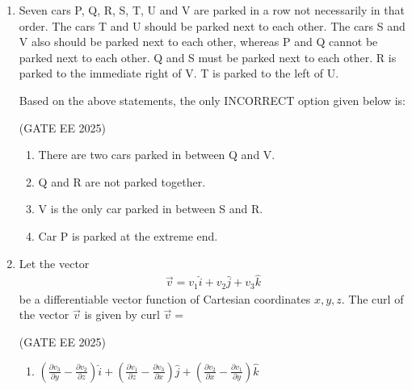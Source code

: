 \documentclass[journal,12pt,onecolumn]{IEEEtran}
\theoremstyle{remark}
\begin{document}
\begin{enumerate}
\hfill(GATE EE 2025)

\begin{multicols}{4}
\begin{enumerate}
\item 65 and 53
\item 60 and 50
\item 55 and 53
\item 55 and 48
\end{enumerate}
\end{multicols}

\item Seven cars P, Q, R, S, T, U and V are parked in a row not necessarily in that order.  
The cars T and U should be parked next to each other. The cars S and V also should be parked next to each other, whereas P and Q cannot be parked next to each other. Q and S must be parked next to each other.  
R is parked to the immediate right of V. T is parked to the left of U.  

Based on the above statements, the only INCORRECT option given below is:

\hfill(GATE EE 2025)

\begin{enumerate}
\item There are two cars parked in between Q and V.
\item Q and R are not parked together.
\item V is the only car parked in between S and R.
\item Car P is parked at the extreme end.
\end{enumerate}

\item Let the vector \begin{align*}
  \vec{v}=v_{1} \hat{i}+v_{2}\hat{j}+v_{3}\hat{k}   
\end{align*}be a differentiable
vector function of Cartesian coordinates $x, y, z$.  
The curl of the vector $\vec{v}$ is given by curl $\vec{v} =$ 

\hfill(GATE EE 2025)

\begin{multicols}{2}
\begin{enumerate}
\item $\left(\frac{\partial v_{3}}{\partial y} - \frac{\partial v_{2}}{\partial z}\right)\hat{i}
+ \left(\frac{\partial v_{1}}{\partial z} - \frac{\partial v_{3}}{\partial x}\right)\hat{j}
+ \left(\frac{\partial v_{2}}{\partial x} - \frac{\partial v_{1}}{\partial y}\right)\hat{k}$


\end{enumerate}
\end{multicols}
\end{enumerate}
\end{document}
